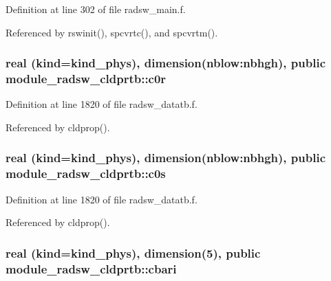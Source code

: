 Definition at line 302 of file radsw\+\_\+main.\+f.



Referenced by rswinit(), spcvrtc(), and spcvrtm().

\subsubsection[{\texorpdfstring{c0r}{c0r}}]{\setlength{\rightskip}{0pt plus 5cm}real (kind=kind\+\_\+phys), dimension(nblow\+:nbhgh), public module\+\_\+radsw\+\_\+cldprtb\+::c0r}\hypertarget{group__module__radsw__main_ga8927b6e7cc810301e3843eb0f5c0c795}{}\label{group__module__radsw__main_ga8927b6e7cc810301e3843eb0f5c0c795}


Definition at line 1820 of file radsw\+\_\+datatb.\+f.



Referenced by cldprop().

\subsubsection[{\texorpdfstring{c0s}{c0s}}]{\setlength{\rightskip}{0pt plus 5cm}real (kind=kind\+\_\+phys), dimension(nblow\+:nbhgh), public module\+\_\+radsw\+\_\+cldprtb\+::c0s}\hypertarget{group__module__radsw__main_gaab7693c5f31ce2182bca61aff77996bc}{}\label{group__module__radsw__main_gaab7693c5f31ce2182bca61aff77996bc}


Definition at line 1820 of file radsw\+\_\+datatb.\+f.



Referenced by cldprop().

\subsubsection[{\texorpdfstring{cbari}{cbari}}]{\setlength{\rightskip}{0pt plus 5cm}real (kind=kind\+\_\+phys), dimension(5), public module\+\_\+radsw\+\_\+cldprtb\+::cbari}\hypertarget{group__module__radsw__main_gae7f1de5c9736894ac7b54c0e0d312f16}{}\label{group__module__radsw__main_gae7f1de5c9736894ac7b54c0e0d312f16}


